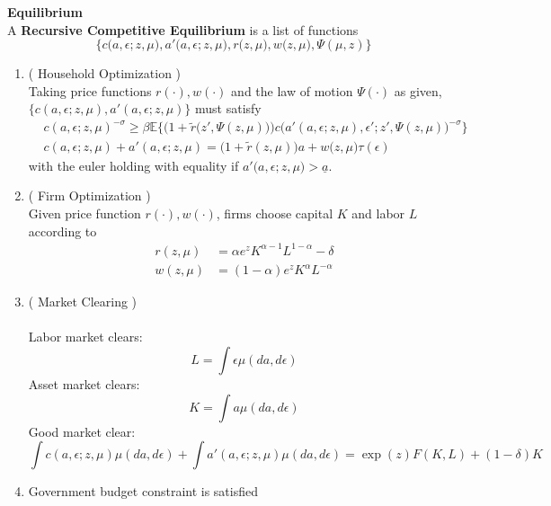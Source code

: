 \documentclass[a4paper,10pt]{article}  %
\begin{document}
\textbf{Equilibrium} \\
A \textbf{Recursive Competitive Equilibrium} is a list of functions 
\[
   \Big\{
   c\big( a,\epsilon ; z, \mu \big) ,a'\big( a,\epsilon ; z, \mu \big),
   r\big( z,\mu \big), w\big( z,\mu \big),
   \Psi (\mu,z)
   \Big\} 
\]
\begin{enumerate}
   \item ( Household Optimization ) \\
         Taking price functions $ r(\cdot), w( \cdot ) $ and the law of motion $\Psi(\cdot)$ as given,
         $ \Big\{ c( a,\epsilon; z, \mu ) , a'( a,\epsilon ; z, \mu ) \Big\}$ must satisfy
         \begin{align}
              & c( a, \epsilon ; z,\mu )^{ - \sigma } \ge
            \beta \mathbb{E} \bigg\{
            \Big( 1+ \tilde{r} \Big( z', \Psi( z, \mu ) \Big) \Big) c\Big( a'( a, \epsilon; z, \mu ),
            \epsilon'; z', \Psi( z,\mu ) \Big)^{- \sigma}
            \bigg\} \label{eq:euler} \\
              & c( a, \epsilon ; z,\mu ) + a'( a,\epsilon; z, \mu ) = \big( 1 + \tilde{r}(z, \mu ) \big)
            a + w \big( z, \mu \big) \tau( \epsilon )  \label{eq:budget_constraint}
         \end{align}
         with the euler holding with equality if $ a'\big( a, \epsilon; z , \mu \big) > \underline{a} $.

   \item ( Firm Optimization ) \\
         Given price function $ r( \cdot ) , w ( \cdot ) $, firms choose capital $K$ and labor $L$ according to
         \begin{align}
            r( z, \mu ) & = \alpha e^{z} K^{ \alpha-1 } L^{ 1- \alpha } - \delta \\
            w( z, \mu ) & = ( 1- \alpha ) e^{z} K^{ \alpha } L^{ - \alpha }
         \end{align}

   \item ( Market Clearing ) \\~\\
         Labor market clears:
         \begin{equation}
            \label{eq:labor_mkt}
            L = \int \epsilon \mu( da, d\epsilon )
         \end{equation}
         Asset market clears:
         \begin{equation}
            \label{eq:asset_mkt}
            K = \int a \mu( da, d \epsilon )
         \end{equation}
         Good market clear:
         \begin{equation}
            \label{eq:asset_mkt}
            \int c( a, \epsilon ; z, \mu) \mu( da, d \epsilon ) + \int a'( a,\epsilon ; z, \mu) \mu( da, d \epsilon )
            = \exp{( z )} F( K,L ) + ( 1- \delta ) K
         \end{equation}
   \item Government budget constraint is satisfied


\end{enumerate}
\end{document}
